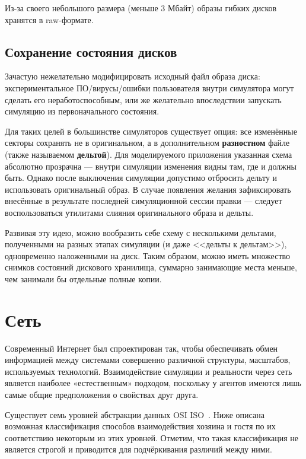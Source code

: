 Из-за своего небольшого размера (меньше 3 Мбайт) образы гибких дисков хранятся в raw-формате.

\subsection{Сохранение состояния дисков}

Зачастую нежелательно модифицировать исходный файл образа диска: экспериментальное ПО/вирусы/ошибки пользователя внутри симулятора могут сделать его неработоспособным, или же желательно впоследствии запускать симуляцию из первоначального состояния.

Для таких целей в большинстве симуляторов существует опция: все изменённые секторы сохранять не в оригинальном, а в дополнительном \textbf{разностном} файле (также называемом \textbf{дельтой}). Для моделируемого приложения указанная схема абсолютно прозрачна --- внутри симуляции изменения видны там, где и должны быть. Однако после выключения симуляции допустимо отбросить дельту и использовать оригинальный образ. В случае появления желания зафиксировать внесённые в результате последней симуляционной сессии правки --- следует воспользоваться утилитами слияния оригинального образа и дельты.

Развивая эту идею, можно вообразить себе схему с несколькими дельтами, полученными на разных этапах симуляции (и даже <<дельты к дельтам>>), одновременно наложенными на диск. Таким образом, можно иметь множество снимков состояний дискового хранилища, суммарно занимающие места меньше, чем занимали бы отдельные полные копии.

\section{Сеть}

Современный Интернет был спроектирован так, чтобы обеспечивать обмен информацией между системами совершенно различной структуры, масштабов, используемых технологий. Взаимодействие симуляции и реальности через сеть является наиболее «естественным» подходом, поскольку у агентов имеются лишь самые общие предположения о свойствах друг друга.

Существует семь уровней абстракции данных OSI ISO~\cite{osi-iso-rus}. Ниже описана возможная классификация способов взаимодействия хозяина и гостя по их соответствию некоторым из этих уровней. Отметим, что такая классификация не является строгой и приводится для подчёркивания различий между ними.

